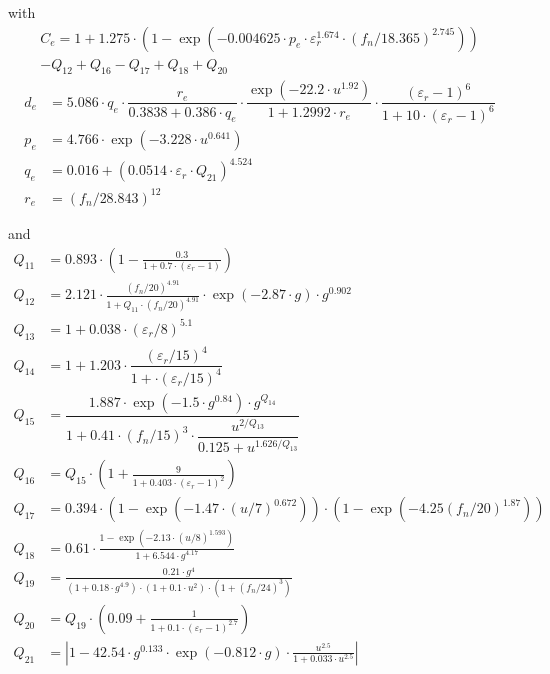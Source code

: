 \documentclass[10pt]{report}
\begin{document}
with
\begin{equation}
\begin{split}
C_e = 1 + 1.275\cdot \left( 1-\exp\left( -0.004625\cdot p_e\cdot \varepsilon_r^{1.674}\cdot
      \left( f_n/18.365 \right) ^{2.745} \right) \right)\\
      - Q_{12}+Q_{16}-Q_{17}+Q_{18}+Q_{20}
\end{split}
\end{equation}
\begin{align}
d_e &= 5.086\cdot q_e\cdot\dfrac{r_e}{0.3838+0.386\cdot q_e}\cdot
      \dfrac{\exp\left(-22.2\cdot u^{1.92}\right)}{1+1.2992\cdot r_e}\cdot
      \dfrac{(\varepsilon_r-1)^6}{1 + 10\cdot (\varepsilon_r-1)^6}\\
p_e &= 4.766\cdot \exp \left(-3.228\cdot u^{0.641}\right)\\
q_e &= 0.016 + \left(0.0514\cdot \varepsilon_r\cdot Q_{21}\right)^{4.524}\\
r_e &= \left( f_n/28.843 \right) ^{12}
\end{align}

and
\begin{align}
Q_{11} &= 0.893\cdot \left( 1 - \frac{0.3}{1+0.7\cdot\left(\varepsilon_r-1\right)} \right)\\
Q_{12} &= 2.121\cdot \frac{\left( f_n/20\right) ^{4.91}}
                         {1+Q_{11}\cdot\left( f_n/20\right) ^{4.91}}
	      \cdot \exp\left(-2.87\cdot g\right)\cdot g^{0.902}\\
Q_{13} &= 1 + 0.038\cdot \left( \varepsilon_r/8 \right) ^{5.1}\\
Q_{14} &= 1 + 1.203\cdot \dfrac{ \left( \varepsilon_r/15 \right) ^4}
                             {1 + \cdot \left( \varepsilon_r/15 \right) ^4}\\
Q_{15} &= \dfrac{ 1.887\cdot \exp\left(-1.5\cdot g^{0.84}\right)\cdot g^{Q_{14}} }
              { 1 + 0.41\cdot \left( f_n/15 \right) ^3 \cdot
	        \dfrac{u^{2/Q_{13}}}{0.125 + u^{1.626/Q_{13}}}}\\
Q_{16} &= Q_{15}\cdot \left( 1 + \frac{9}{1+0.403\cdot \left(\varepsilon_r-1\right)^2} \right)\\
Q_{17} &= 0.394\cdot \left( 1-\exp\left( -1.47\cdot\left( u/7 \right) ^{0.672} \right) \right)
        \cdot \left( 1-\exp\left( -4.25\left( f_n/20 \right) ^{1.87} \right) \right)\\
Q_{18} &= 0.61\cdot\frac{1-\exp\left( -2.13\cdot\left( u/8 \right) ^{1.593} \right)}
                  {1+6.544\cdot g^{4.17}}\\
Q_{19} &= \frac{ 0.21\cdot g^4 }{\left(1+0.18\cdot g^{4.9}\right)\cdot \left(1+0.1\cdot u^2\right) \cdot
                \left( 1+\left( f_n/24 \right) ^3 \right)}\\
Q_{20} &= Q_{19}\cdot \left( 0.09 + \frac{1}{1+0.1\cdot \left(\varepsilon_r-1\right)^{2.7}} \right)\\
Q_{21} &= \left| 1-42.54\cdot g^{0.133}\cdot \exp\left(-0.812\cdot g\right)
                   \cdot\frac{u^{2.5}}{1+0.033\cdot u^{2.5}} \right|
\end{align}
\end{document}
